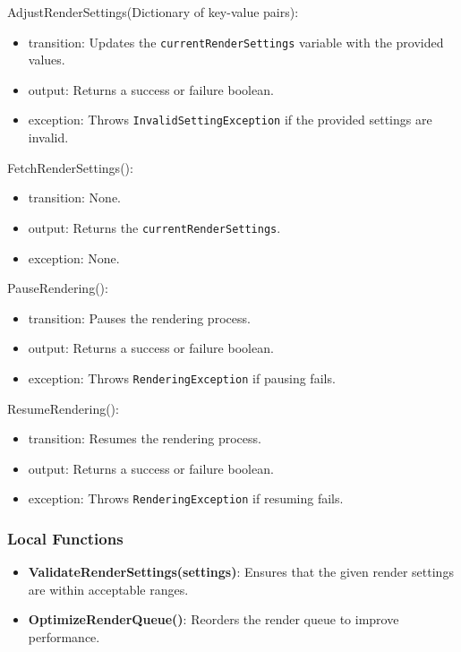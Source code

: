 \documentclass[12pt, titlepage]{article}
\begin{document}
\noindent AdjustRenderSettings(Dictionary of key-value pairs):
\begin{itemize}
  \item transition: Updates the \texttt{currentRenderSettings} variable with the provided values.
  \item output: Returns a success or failure boolean.
  \item exception: Throws \texttt{InvalidSettingException} if the provided settings are invalid.
\end{itemize}

\noindent FetchRenderSettings():
\begin{itemize}
  \item transition: None.
  \item output: Returns the \texttt{currentRenderSettings}.
  \item exception: None.
\end{itemize}

\noindent PauseRendering():
\begin{itemize}
  \item transition: Pauses the rendering process.
  \item output: Returns a success or failure boolean.
  \item exception: Throws \texttt{RenderingException} if pausing fails.
\end{itemize}

\noindent ResumeRendering():
\begin{itemize}
  \item transition: Resumes the rendering process.
  \item output: Returns a success or failure boolean.
  \item exception: Throws \texttt{RenderingException} if resuming fails.
\end{itemize}

\subsubsection{Local Functions}

\begin{itemize}
  \item \textbf{ValidateRenderSettings(settings)}: Ensures that the given render settings are within acceptable ranges.
  \item \textbf{OptimizeRenderQueue()}: Reorders the render queue to improve performance.
\end{itemize}
\end{document}
